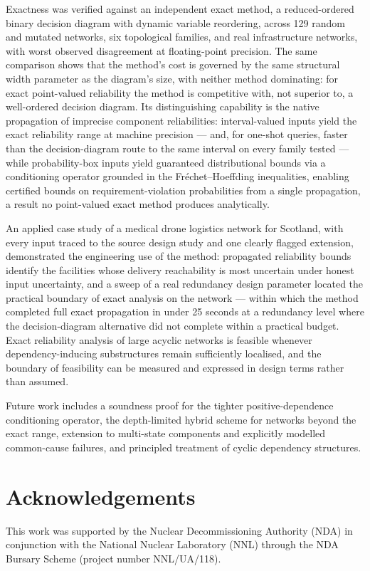 \documentclass[preprint,12pt]{elsarticle}
\theoremstyle{definition}
\begin{document}
Exactness was verified against an independent exact method, a reduced-ordered binary decision diagram
with dynamic variable reordering, across 129 random and mutated networks, six topological families, and
real infrastructure networks, with worst observed disagreement at floating-point precision. The same
comparison shows that the method's cost is governed by the same structural width parameter as the
diagram's size, with neither method dominating: for exact point-valued reliability the method is
competitive with, not superior to, a well-ordered decision diagram. Its distinguishing capability is the
native propagation of imprecise component reliabilities: interval-valued inputs yield the exact
reliability range at machine precision --- and, for one-shot queries, faster than the decision-diagram
route to the same interval on every family tested --- while probability-box inputs yield guaranteed
distributional bounds via a conditioning operator grounded in the Fr\'echet--Hoeffding inequalities,
enabling certified bounds on requirement-violation probabilities from a single propagation, a result no
point-valued exact method produces analytically.

An applied case study of a medical drone logistics network for Scotland, with every input traced to the
source design study and one clearly flagged extension, demonstrated the engineering use of the method:
propagated reliability bounds identify the facilities whose delivery reachability is most uncertain
under honest input uncertainty, and a sweep of a real redundancy design parameter located the practical
boundary of exact analysis on the network --- within which the method completed full exact propagation
in under 25 seconds at a redundancy level where the decision-diagram alternative did not complete within
a practical budget. Exact reliability analysis of large acyclic networks is feasible whenever
dependency-inducing substructures remain sufficiently localised, and the boundary of feasibility can be
measured and expressed in design terms rather than assumed.

Future work includes a soundness proof for the tighter positive-dependence conditioning operator, the
depth-limited hybrid scheme for networks beyond the exact range, extension to multi-state components and
explicitly modelled common-cause failures, and principled treatment of cyclic dependency structures.

\section*{Acknowledgements}
This work was supported by the Nuclear Decommissioning Authority (NDA) in conjunction with the National
Nuclear Laboratory (NNL) through the NDA Bursary Scheme (project number NNL/UA/118).
\end{document}
